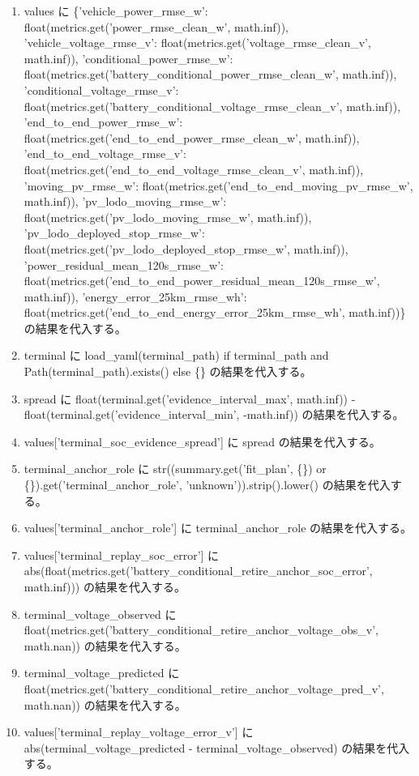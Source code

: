 \documentclass[a4paper,11pt]{article}
\begin{document}
\begin{enumerate}[leftmargin=1.8em]
\item values に \{'vehicle\_power\_rmse\_w': float(metrics.get('power\_rmse\_clean\_w', math.inf)), 'vehicle\_voltage\_rmse\_v': float(metrics.get('voltage\_rmse\_clean\_v', math.inf)), 'conditional\_power\_rmse\_w': float(metrics.get('battery\_conditional\_power\_rmse\_clean\_w', math.inf)), 'conditional\_voltage\_rmse\_v': float(metrics.get('battery\_conditional\_voltage\_rmse\_clean\_v', math.inf)), 'end\_to\_end\_power\_rmse\_w': float(metrics.get('end\_to\_end\_power\_rmse\_clean\_w', math.inf)), 'end\_to\_end\_voltage\_rmse\_v': float(metrics.get('end\_to\_end\_voltage\_rmse\_clean\_v', math.inf)), 'moving\_pv\_rmse\_w': float(metrics.get('end\_to\_end\_moving\_pv\_rmse\_w', math.inf)), 'pv\_lodo\_moving\_rmse\_w': float(metrics.get('pv\_lodo\_moving\_rmse\_w', math.inf)), 'pv\_lodo\_deployed\_stop\_rmse\_w': float(metrics.get('pv\_lodo\_deployed\_stop\_rmse\_w', math.inf)), 'power\_residual\_mean\_120s\_rmse\_w': float(metrics.get('end\_to\_end\_power\_residual\_mean\_120s\_rmse\_w', math.inf)), 'energy\_error\_25km\_rmse\_wh': float(metrics.get('end\_to\_end\_energy\_error\_25km\_rmse\_wh', math.inf))\} の結果を代入する。
\item terminal に load\_yaml(terminal\_path) if terminal\_path and Path(terminal\_path).exists() else \{\} の結果を代入する。
\item spread に float(terminal.get('evidence\_interval\_max', math.inf)) - float(terminal.get('evidence\_interval\_min', -math.inf)) の結果を代入する。
\item values['terminal\_soc\_evidence\_spread'] に spread の結果を代入する。
\item terminal\_anchor\_role に str((summary.get('fit\_plan', \{\}) or \{\}).get('terminal\_anchor\_role', 'unknown')).strip().lower() の結果を代入する。
\item values['terminal\_anchor\_role'] に terminal\_anchor\_role の結果を代入する。
\item values['terminal\_replay\_soc\_error'] に abs(float(metrics.get('battery\_conditional\_retire\_anchor\_soc\_error', math.inf))) の結果を代入する。
\item terminal\_voltage\_observed に float(metrics.get('battery\_conditional\_retire\_anchor\_voltage\_obs\_v', math.nan)) の結果を代入する。
\item terminal\_voltage\_predicted に float(metrics.get('battery\_conditional\_retire\_anchor\_voltage\_pred\_v', math.nan)) の結果を代入する。
\item values['terminal\_replay\_voltage\_error\_v'] に abs(terminal\_voltage\_predicted - terminal\_voltage\_observed) の結果を代入する。

\end{enumerate}
\end{document}
